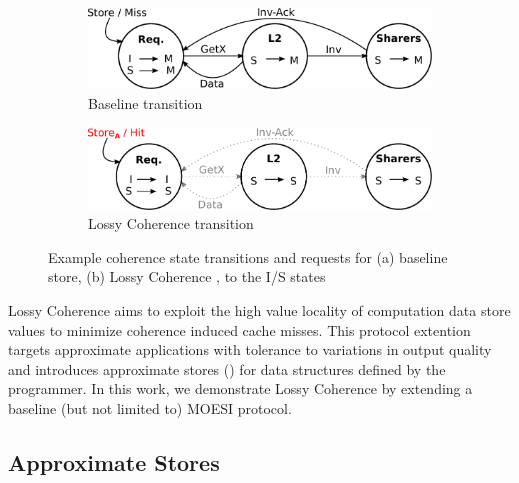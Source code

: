 \begin{figure}[t]
    \centering
    \begin{subfigure}[t]{0.5\textwidth}

        \centering
        \includegraphics[scale=0.5]{figures/transition_example.pdf}
        \caption{Baseline transition}
        \label{fig:base_transition}

    \end{subfigure}%

    \begin{subfigure}[t]{0.5\textwidth}
       
        \centering
        \includegraphics[scale=0.5]{figures/transition_approx_example.pdf}
        \caption{Lossy Coherence transition}
        \label{fig:lossy_transition}

    \end{subfigure}
\caption{Example coherence state transitions and requests for (a) baseline store, (b) Lossy Coherence \storea, to the I/S states }
\label{fig:transition}
\end{figure}

Lossy Coherence aims to exploit the high value locality of computation data store values to minimize coherence induced cache misses. This protocol extention targets approximate applications with tolerance to variations in output quality and introduces approximate stores (\storea) for data structures defined by the programmer. In this work, we demonstrate Lossy Coherence by extending a baseline (but not limited to) MOESI protocol.

\subsection{Approximate Stores}

